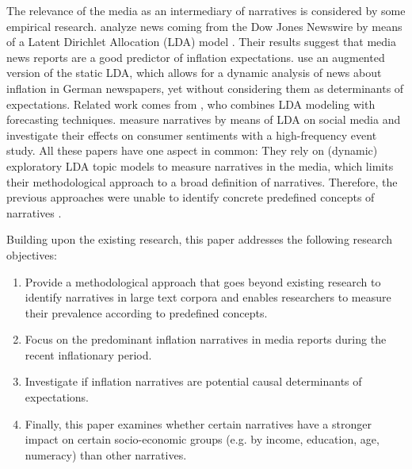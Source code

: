 The relevance of the media as an intermediary of narratives \citep{Ellen.2022} is considered by some empirical research. \cite{Larsen.2021} analyze news coming from the Dow Jones Newswire by means of a Latent Dirichlet Allocation (LDA) model \citep{blei.2003}.  Their results suggest that media news reports are a good predictor of inflation expectations. \cite{Mueller.2022} use an augmented version of the static LDA, which allows for a dynamic analysis of news about inflation in German newspapers, yet without considering them as determinants of expectations. Related work comes from \cite{Hong.2022}, who combines LDA modeling with forecasting techniques. \cite{Macaulay.2022} measure narratives by means of LDA on social media and investigate their effects on consumer sentiments with a high-frequency event study. All these papers have one aspect in common: They rely on (dynamic) exploratory LDA topic models to measure narratives in the media, which limits their methodological approach to a broad definition of narratives. Therefore, the previous approaches were unable to identify concrete predefined concepts of narratives \citep{reccius.2024}. 

Building upon the existing research, this paper addresses the following research objectives:

\begin{enumerate}
	\item Provide a methodological approach that goes beyond existing research to identify narratives in large text corpora and enables researchers to measure their prevalence according to predefined concepts.
	\item Focus on the predominant inflation narratives in media reports during the recent inflationary period. 
	\item  Investigate if inflation narratives are potential causal determinants of expectations.  
	\item Finally, this paper examines whether certain narratives have a stronger impact on certain socio-economic groups (e.g. by income, education, age, numeracy) than other narratives. 
\end{enumerate}

